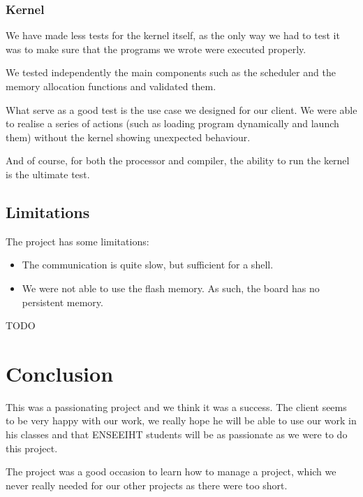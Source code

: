 \documentclass[openany, a4paper]{book}
\begin{document}
      \subsection{Kernel}
        We have made less tests for the kernel itself, as the only way we had
        to test it was to make sure that the programs we wrote were executed
        properly.

        We tested independently the main components such as the scheduler and
        the memory allocation functions and validated them.

        What serve as a good test is the use case we designed for our client. We
        were able to realise a series of actions (such as loading program
        dynamically and launch them) without the kernel showing unexpected
        behaviour.

        And of course, for both the processor and compiler, the ability to run
        the kernel is the ultimate test.

    \section{Limitations}
      The project has some limitations:
      \begin{itemize}
        \item The communication is quite slow, but sufficient for a shell.
        \item We were not able to use the flash memory. As such, the board
          has no persistent memory.
      \end{itemize}

      TODO

  \chapter{Conclusion}
    This was a passionating project and we think it was a success. The client
    seems to be very happy with our work, we really hope he will be able to use
    our work in his classes and that ENSEEIHT students will be as passionate as
    we were to do this project.

    The project was a good occasion to learn how to manage a project, which we
    never really needed for our other projects as there were too short.

  \setcounter{chapter}{0}
  \renewcommand{\thechapter}{\Alph{chapter}}
\end{document}
